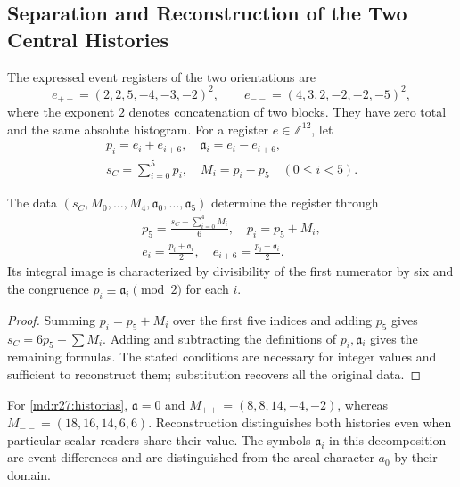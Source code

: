 \subsection{Separation and Reconstruction of the Two Central Histories}
The expressed event registers of the two orientations are
\begin{equation}
 e_{++}=(2,2,5,-4,-3,-2)^2,\qquad
 e_{--}=(4,3,2,-2,-2,-5)^2,
 \label{md:r27:historias}
\end{equation}
where the exponent $2$ denotes concatenation of two blocks. They have zero
total and the same absolute histogram. For a register $e\in\mathbb Z^{12}$,
let
\begin{equation}
 \begin{gathered}
 p_i=e_i+e_{i+6},\quad \mathfrak a_i=e_i-e_{i+6},\\
 s_C=\sum_{i=0}^{5}p_i,\quad M_i=p_i-p_5\quad(0\le i<5).
 \end{gathered}
 \label{md:r27:registro-electron}
\end{equation}
\begin{proposition}
The data $(s_C,M_0,\ldots,M_4,\mathfrak a_0,\ldots,\mathfrak a_5)$ determine the register through
\begin{equation}
 \begin{gathered}
 p_5=\frac{s_C-\sum_{i=0}^{4}M_i}{6},\quad p_i=p_5+M_i,\\
 e_i=\frac{p_i+\mathfrak a_i}{2},\quad e_{i+6}=\frac{p_i-\mathfrak a_i}{2}.
 \end{gathered}
 \label{md:r27:inversa-electron}
\end{equation}
Its integral image is characterized by divisibility of the first numerator
by six and the congruence $p_i\equiv \mathfrak a_i\pmod2$ for each $i$.
\end{proposition}
\begin{proof}
Summing $p_i=p_5+M_i$ over the first five indices and adding $p_5$ gives
$s_C=6p_5+\sum M_i$. Adding and subtracting the definitions of $p_i,\mathfrak a_i$
gives the remaining formulas. The stated conditions are necessary for integer
values and sufficient to reconstruct them; substitution recovers all the
original data.
\end{proof}
For \eqref{md:r27:historias}, $\mathfrak a=0$ and
$M_{++}=(8,8,14,-4,-2)$, whereas $M_{--}=(18,16,14,6,6)$.
Reconstruction distinguishes both histories even when particular scalar
readers share their value. The symbols $\mathfrak a_i$ in this decomposition are event
differences and are distinguished from the areal character $a_0$ by their domain.

